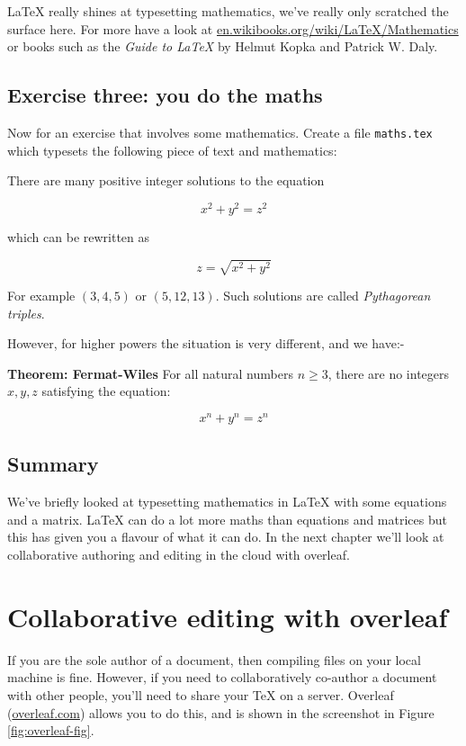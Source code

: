 \documentclass[
]{book}
\begin{document}
LaTeX really shines at typesetting mathematics, we've really only scratched the surface here. For more have a look at
\href{https://en.wikibooks.org/wiki/LaTeX/Mathematics}{en.wikibooks.org/wiki/LaTeX/Mathematics} or books such as the \emph{Guide to LaTeX} by Helmut Kopka and Patrick W. Daly. \citep{kopka}

\hypertarget{ex3}{%
\section{Exercise three: you do the maths}\label{ex3}}

Now for an exercise that involves some mathematics. Create a file \texttt{maths.tex} which typesets the following piece of text and mathematics:

There are many positive integer solutions to the equation

\[ x^2 + y^2 =  z^2 \]

which can be rewritten as

\[ z = \sqrt{x^2 + y^2} \]

For example \((3,4, 5)\) or \((5,12,13)\). Such solutions are called \emph{Pythagorean triples}.

However, for higher powers the situation is very different, and we have:-

\textbf{Theorem: Fermat-Wiles}
For all natural numbers \(n ≥ 3\), there are no integers \(x,y,z\) satisfying the equation:

\[ x^n + y^n = z^n \]

\hypertarget{mathconc}{%
\section{Summary}\label{mathconc}}

We've briefly looked at typesetting mathematics in LaTeX with some equations and a matrix. LaTeX can do a lot more maths than equations and matrices but this has given you a flavour of what it can do. In the next chapter we'll look at collaborative authoring and editing in the cloud with overleaf.

\hypertarget{overleaf}{%
\chapter{Collaborative editing with overleaf}\label{overleaf}}

If you are the sole author of a document, then compiling files on your local machine is fine. However, if you need to collaboratively co-author a document with other people, you'll need to share your TeX on a server. Overleaf (\href{https://www.overleaf.com/}{overleaf.com}) allows you to do this, and is shown in the screenshot in Figure \ref{fig:overleaf-fig}.
\end{document}
